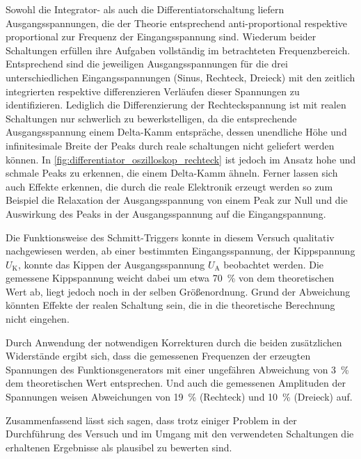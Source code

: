 Sowohl die Integrator- als auch die Differentiatorschaltung  liefern Ausgangsspannungen, die der Theorie
entsprechend anti-proportional respektive proportional zur Frequenz der Eingangsspannung sind. Wiederum 
beider Schaltungen erfüllen ihre Aufgaben vollständig im betrachteten Frequenzbereich.
Entsprechend sind die jeweiligen Ausgangsspannungen für die drei unterschiedlichen Eingangsspannungen
(Sinus, Rechteck, Dreieck) mit den zeitlich integrierten respektive differenzieren Verläufen 
dieser Spannungen zu identifizieren. Lediglich die Differenzierung der Rechteckspannung ist mit realen 
Schaltungen nur schwerlich zu bewerkstelligen, da die entsprechende Ausgangsspannung einem Delta-Kamm
entspräche, dessen unendliche Höhe und infinitesimale Breite der Peaks durch reale schaltungen 
nicht geliefert werden können. In \cref{fig:differentiator_oszilloskop_rechteck} ist jedoch im Ansatz 
hohe und schmale Peaks zu erkennen, die einem Delta-Kamm ähneln. Ferner lassen sich auch Effekte erkennen,
die durch die reale Elektronik erzeugt werden so zum Beispiel die Relaxation der Ausgangsspannung von einem 
Peak zur Null und die Auswirkung des Peaks in der Ausgangsspannung auf die Eingangspannung.

Die Funktionsweise des Schmitt-Triggers konnte in diesem Versuch qualitativ nachgewiesen werden,
ab einer bestimmten Eingangsspannung, der Kippspannung $U_{\mathrm{K}}$, konnte das Kippen der 
Ausgangsspannung $U_{\mathrm{A}}$ beobachtet werden. Die gemessene Kippspannung weicht dabei um 
etwa \SI{70}{\percent} von dem theoretischen Wert ab, liegt jedoch noch in der selben Größenordnung.
Grund der Abweichung könnten Effekte der realen Schaltung sein, die in die theoretische Berechnung
nicht eingehen. 

Durch Anwendung der notwendigen Korrekturen durch die beiden zusätzlichen Widerstände ergibt sich,
dass die gemessenen Frequenzen der erzeugten Spannungen des Funktionsgenerators mit einer ungefähren 
Abweichung von \SI{3}{\percent} dem theoretischen Wert entsprechen. Und auch die gemessenen Amplituden 
der Spannungen weisen Abweichungen von \SI{19}{\percent} (Rechteck) und \SI{10}{\percent} (Dreieck)
auf.

Zusammenfassend lässt sich sagen, dass trotz einiger Problem in der Durchführung des Versuch 
und im Umgang mit den verwendeten Schaltungen die erhaltenen Ergebnisse als plausibel zu bewerten sind.  



  


 